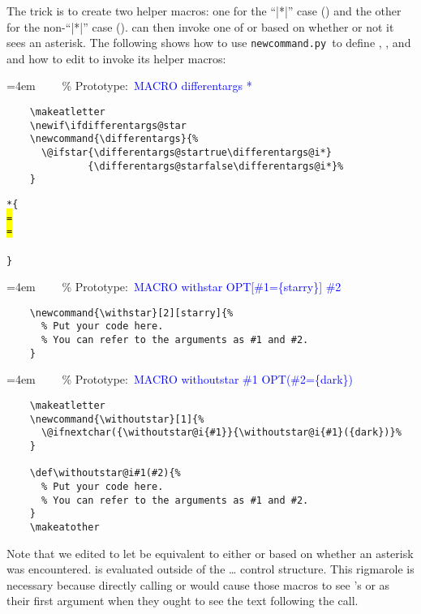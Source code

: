 \documentclass{ltxdoc}
\newcommand*{\ncpy}{\texttt{newcommand.py}}      %
\newcommand{\prototype}[1]{{%
  \bigskip
  \noindent
  \ttfamily\small\raggedright
  \hangafter=1\hangindent=4em
  ~~~~\% Prototype:~\textcolor{blue}{#1}\strut\par
  \vspace*{-0.5\baselineskip}%
}}
\begin{document}
The trick is to create two helper macros: one for the ``|*|'' case
() and the other for the non-``|*|'' case
().   can then invoke one of
 or  based on whether or not it sees an
asterisk.  The following shows how to use \ncpy\ to define
, , and  and how to
edit  to invoke its helper macros:

\prototype{MACRO differentargs *}
\begin{verbatim}
    \makeatletter
    \newif\ifdifferentargs@star
    \newcommand{\differentargs}{%
      \@ifstar{\differentargs@startrue\differentargs@i*}
              {\differentargs@starfalse\differentargs@i*}%
    }
\end{verbatim}
\begingroup
\small
\begin{alltt}
    *\{%
        % Put code for the "*" case here.
        \colorbox{yellow}{=}
        % Put code for the non-"*" case here.
        \colorbox{yellow}{=}
      % Put code common to both cases here (and/or above the \cs{ifdifferentargs@star}).
      \colorbox{yellow}{}
    \}
\end{alltt}
\endgroup

\prototype{MACRO withstar OPT[\#1=\{starry\}] \#2}
\begin{verbatim}
    \newcommand{\withstar}[2][starry]{%
      % Put your code here.
      % You can refer to the arguments as #1 and #2.
    }
\end{verbatim}

\prototype{MACRO withoutstar \#1 OPT(\#2=\{dark\})}
\begin{verbatim}
    \makeatletter
    \newcommand{\withoutstar}[1]{%
      \@ifnextchar({\withoutstar@i{#1}}{\withoutstar@i{#1}({dark})}%
    }

    \def\withoutstar@i#1(#2){%
      % Put your code here.
      % You can refer to the arguments as #1 and #2.
    }
    \makeatother
\end{verbatim}

Note that we edited  to let  be
equivalent to either  or  based on
whether an asterisk was encountered.   is evaluated outside
of the \dots\linebreak[0] control
structure.  This rigmarole is necessary because directly calling
 or  would cause those macros to see
's  or  as their first
argument when they ought to see the text following the
 call.
\end{document}
